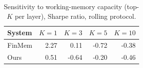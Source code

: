 \begin{table}[ht]
\centering
\caption{Sensitivity to working-memory capacity (top-$K$ per layer), Sharpe ratio, rolling protocol.}
\label{tab:topk}
\begin{tabular}{lrrrr}
\hline
System & $K=1$ & $K=3$ & $K=5$ & $K=10$ \\
\hline
FinMem & 2.27 & 0.11 & -0.72 & -0.38 \\
Ours & 0.51 & -0.64 & -0.20 & -0.46 \\
\hline
\end{tabular}
\end{table}
